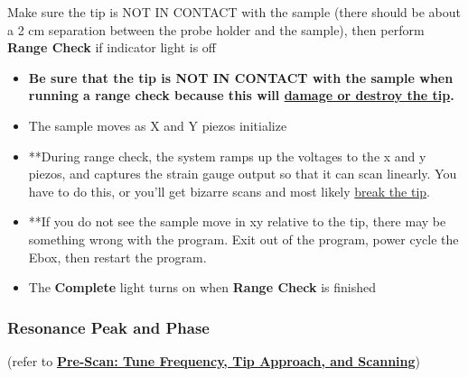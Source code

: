 \documentclass{../lab}
\begin{document}
Make sure the tip is NOT IN CONTACT with the sample (there should be about a 2 cm separation between the probe holder and the sample), then perform \textbf{Range Check} if indicator light is off
\begin{itemize}
    \item \textbf{Be sure that the tip is NOT IN CONTACT with the sample when running a range check because this will \hyperref[subsec:BrokenTip]{damage or destroy the tip}.}
    
    \item The sample moves as X and Y piezos initialize
    
    \item **During range check, the system ramps up the voltages to the x and y piezos, and captures the strain gauge output so that it can scan linearly. You have to do this, or you'll get bizarre scans and most likely \hyperref[subsec:BrokenTip]{break the tip}.
    
    \item **If you do not see the sample move in xy relative to the tip, there may be something wrong with the program.  Exit out of the program, power cycle the Ebox, then restart the program.
    
    \item The \textbf{Complete} light turns on when \textbf{Range Check} is finished
\end{itemize}

\subsubsection{Resonance Peak and Phase}

(refer to \href{http://experimentationlab.berkeley.edu/sites/default/files/prescan\_final2.mp4}{\textbf{Pre-Scan: Tune Frequency, Tip Approach, and Scanning}})
\end{document}

